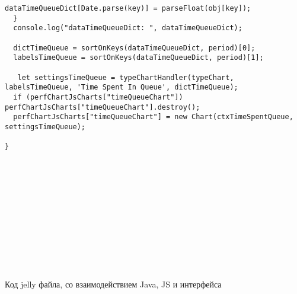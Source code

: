 \begin{lstlisting}
dataTimeQueueDict[Date.parse(key)] = parseFloat(obj[key]);
  }
  console.log("dataTimeQueueDict: ", dataTimeQueueDict);

  dictTimeQueue = sortOnKeys(dataTimeQueueDict, period)[0];
  labelsTimeQueue = sortOnKeys(dataTimeQueueDict, period)[1];

   let settingsTimeQueue = typeChartHandler(typeChart, labelsTimeQueue, 'Time Spent In Queue', dictTimeQueue);
  if (perfChartJsCharts["timeQueueChart"]) perfChartJsCharts["timeQueueChart"].destroy();
  perfChartJsCharts["timeQueueChart"] = new Chart(ctxTimeSpentQueue, settingsTimeQueue);

}













\end{lstlisting}

Код jelly файла, со взаимодействием Java, JS и интерфейса

